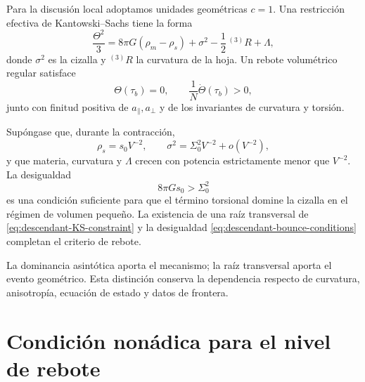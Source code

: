Para la discusi\'on local adoptamos unidades geom\'etricas \(c=1\). Una
restricci\'on efectiva de Kantowski--Sachs tiene la forma
\begin{equation}
 \frac{\Theta^2}{3}
 =8\pi G(\rho_m-\rho_s)
 +\sigma^2-\frac12\,{}^{(3)}R+\Lambda,
 \label{eq:descendant-KS-constraint}
\end{equation}
donde \(\sigma^2\) es la cizalla y \({}^{(3)}R\) la curvatura de la hoja.
Un rebote volum\'etrico regular satisface
\begin{equation}
 \boxed{
 \Theta(\tau_b)=0,
 \qquad
 \frac1N\dot\Theta(\tau_b)>0,}
 \label{eq:descendant-bounce-conditions}
\end{equation}
junto con finitud positiva de \(a_\parallel,a_\perp\) y de los invariantes
de curvatura y torsi\'on.

\begin{criterion}
\label{crit:descendant-torsion-dominance}
Sup\'ongase que, durante la contracci\'on,
\begin{equation}
 \rho_s=s_0V^{-2},
 \qquad
 \sigma^2=\Sigma_0^2V^{-2}+o(V^{-2}),
 \label{eq:descendant-torsion-shear-scaling}
\end{equation}
y que materia, curvatura y \(\Lambda\) crecen con potencia estrictamente
menor que \(V^{-2}\). La desigualdad
\begin{equation}
 \boxed{8\pi Gs_0>\Sigma_0^2}
 \label{eq:descendant-torsion-dominates-shear}
\end{equation}
es una condici\'on suficiente para que el t\'ermino torsional domine la
cizalla en el r\'egimen de volumen peque\~no. La existencia de una ra\'iz
transversal de \cref{eq:descendant-KS-constraint} y la desigualdad
\cref{eq:descendant-bounce-conditions} completan el criterio de rebote.
\end{criterion}

La dominancia asint\'otica aporta el mecanismo; la ra\'iz transversal aporta
el evento geom\'etrico. Esta distinci\'on conserva la dependencia respecto de
curvatura, anisotrop\'ia, ecuaci\'on de estado y datos de frontera.

\section{Condici\'on non\'adica para el nivel de rebote}


